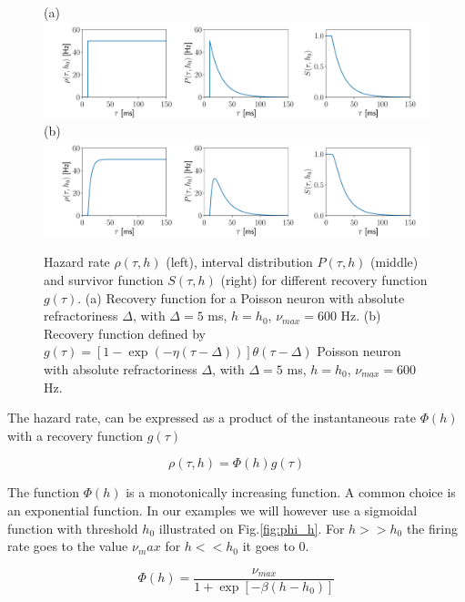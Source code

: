 \documentclass[12pt,twoside]{report}
\begin{document}
\begin{figure}[h!]
	(a) \\
	\includegraphics[width=\linewidth]{poissonRHOSP.pdf}
	(b)\\
	\includegraphics[width=\linewidth]{expRHOSP.pdf}
	\caption{Hazard rate $\rho(\tau,h)$ (left), interval distribution $P(\tau,h)$ (middle) and survivor function $S(\tau,h)$ (right) for different recovery function $g(\tau)$. (a) Recovery function for a Poisson neuron with absolute refractoriness $\Delta$, with $\Delta=5$ ms, $h=h_0$, $\nu_{max}=600$ Hz.  (b) Recovery function defined  by $ g(\tau)=\left[1-\exp(-\eta(\tau-\Delta))\right]\theta(\tau-\Delta)$ Poisson neuron with absolute refractoriness $\Delta$, with $\Delta=5$ ms, $h=h_0$, $\nu_{max}=600$ Hz.  }
	\label{fig:renewalprocess}
\end{figure}

The hazard rate, can be expressed as a product of the instantaneous rate $\Phi(h)$ with a recovery function $g(\tau)$

\begin{equation}
\label{eq:rho}
\rho(\tau,h)=\Phi(h)g(\tau)
\end{equation}

The function $\Phi(h)$ is a monotonically increasing function. A common choice is an exponential function. In our examples we will however use a sigmoidal function with threshold $h_0$ illustrated on Fig.\ref{fig:phi_h}. For $h>>h_0$ the firing rate goes to the value $\nu_max$ for $h<<h_0$ it goes to $0$.

\begin{equation}
\label{eq:phi}
\Phi(h)=\frac{\nu_{max}}{1+\exp[-\beta(h-h_0)]}
\end{equation}
\end{document}
